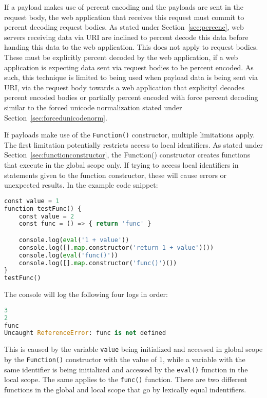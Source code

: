 If a payload makes use of percent encoding and the payloads are sent in the request body, the web application that receives this request must commit to percent decoding request bodies. As stated under Section~\ref{sec:percenc}, web servers receiving data via URI are inclined to percent decode this data before handing this data to the web application. This does not apply to request bodies. These must be explicitly percent decoded by the web application, if a web application is expecting data sent via request bodies to be percent encoded. As such, this technique is limited to being used when payload data is being sent via URI, via the request body towards a web application that explicityl decodes percent encoded bodies or partially percent encoded with force percent decoding similar to the forced unicode normalization stated under Section~\ref{sec:forcedunicodenorm}.

If payloads make use of the \verb|Function()| constructor, multiple limitations apply. The first limitation potentially restricts access to local identifiers. As stated under Section~\ref{sec:functionconstructor}, the Function() constructor creates functions that execute in the global scope only. If trying to access local identifiers in statements given to the function constructor, these will cause errors or unexpected results. In the example code snippet:

\begin{lstlisting}[style=basicStyle, language=Python]
const value = 1
function testFunc() {
	const value = 2
	const func = () => { return 'func' }

	console.log(eval('1 + value'))
	console.log([].map.constructor('return 1 + value')())
	console.log(eval('func()'))
	console.log([].map.constructor('func()')())
}
testFunc()
\end{lstlisting}

The console will log the following four logs in order:

\begin{lstlisting}[style=basicStyle, language=Python]
3 
2 
func 
Uncaught ReferenceError: func is not defined
\end{lstlisting}

This is caused by the variable \verb|value| being initialized and accessed in global scope by the \verb|Function()| constructor with the value of 1, while a variable with the same identifier is being initialized and accessed by the \verb|eval()| function in the local scope. The same applies to the \verb|func()| function. There are two different functions in the global and local scope that go by lexically equal indentifiers.

